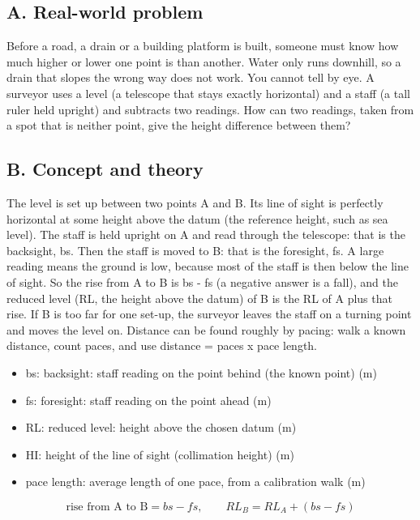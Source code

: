 \documentclass[11pt,a4paper]{article}
\begin{document}
\subsection*{A. Real-world problem}
Before a road, a drain or a building platform is built, someone must know how much higher or lower one point is than another. Water only runs downhill, so a drain that slopes the wrong way does not work. You cannot tell by eye. A surveyor uses a level (a telescope that stays exactly horizontal) and a staff (a tall ruler held upright) and subtracts two readings. How can two readings, taken from a spot that is neither point, give the height difference between them?

\subsection*{B. Concept and theory}
The level is set up between two points A and B. Its line of sight is perfectly horizontal at some height above the datum (the reference height, such as sea level). The staff is held upright on A and read through the telescope: that is the backsight, bs. Then the staff is moved to B: that is the foresight, fs. A large reading means the ground is low, because most of the staff is then below the line of sight. So the rise from A to B is bs - fs (a negative answer is a fall), and the reduced level (RL, the height above the datum) of B is the RL of A plus that rise. If B is too far for one set-up, the surveyor leaves the staff on a turning point and moves the level on. Distance can be found roughly by pacing: walk a known distance, count paces, and use distance = paces x pace length.

\begin{itemize}[nosep]
\item bs: backsight: staff reading on the point behind (the known point) (m)
\item fs: foresight: staff reading on the point ahead (m)
\item RL: reduced level: height above the chosen datum (m)
\item HI: height of the line of sight (collimation height) (m)
\item pace length: average length of one pace, from a calibration walk (m)
\end{itemize}

\begin{equation*}
\text{rise from A to B}=bs-fs,\qquad RL_B=RL_A+(bs-fs)
\end{equation*}
\end{document}
